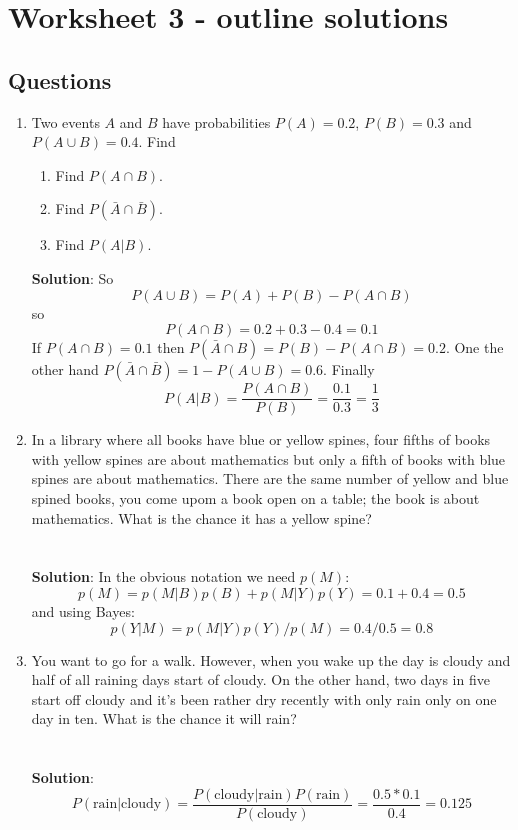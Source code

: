 \documentclass[11pt,a4paper]{scrartcl}
\begin{document}
\section*{Worksheet 3 - outline solutions}

\subsection*{Questions}

\begin{enumerate}

\item Two events $A$ and $B$ have probabilities $P(A)=0.2$, $P(B)=0.3$ and $P(A\cup B)=0.4$. Find
\begin{enumerate}
\item Find $P(A\cap B)$.
\item Find $P(\bar{A}\cap \bar{B})$.
\item Find $P(A|B)$.
\end{enumerate}
\textbf{Solution}: So
\begin{equation}
P(A\cup B)=P(A)+P(B)-P(A\cap B)
\end{equation}
so 
\begin{equation}
P(A\cap B)=0.2+0.3-0.4=0.1
\end{equation}
If $P(A\cap B)=0.1$ then $P(\bar{A}\cap B)=P(B)-P(A\cap B)=0.2$. One the other hand
$P(\bar{A}\cap \bar{B})=1-P(A\cup B)=0.6$. Finally
\begin{equation}
P(A|B)=\frac{P(A\cap B)}{P(B)}=\frac{0.1}{0.3}=\frac{1}{3}
\end{equation}


\item In a library where all books have blue or yellow spines, four
  fifths of books with yellow spines are about mathematics but only a
  fifth of books with blue spines are about mathematics. There are the
  same number of yellow and blue spined books, you come upom a book
  open on a table; the book is about mathematics. What is the chance
  it has a yellow spine?\\ \\ \\
  \textbf{Solution}: In the obvious notation we need $p(M)$:
  $$p(M)=p(M|B)p(B)+p(M|Y)p(Y)=0.1+0.4=0.5$$
  and using Bayes:
  $$p(Y|M)=p(M|Y)p(Y)/p(M)=0.4/0.5=0.8$$  


\item You want to go for a walk. However, when you wake up the day is
  cloudy and half of all raining days start of cloudy. On the other
  hand, two days in five start off cloudy and it's been rather dry
  recently with only rain only on one day in ten. What is the chance
  it will rain?\\ \\ \\
  \textbf{Solution}:
  \begin{equation}
      P(\mbox{rain}|\mbox{cloudy})=\frac{P(\mbox{cloudy}|\mbox{rain})P(\mbox{rain})}{P(\mbox{cloudy})}=\frac{0.5*0.1}{0.4}=0.125
    \end{equation}



\end{enumerate}
\end{document}

